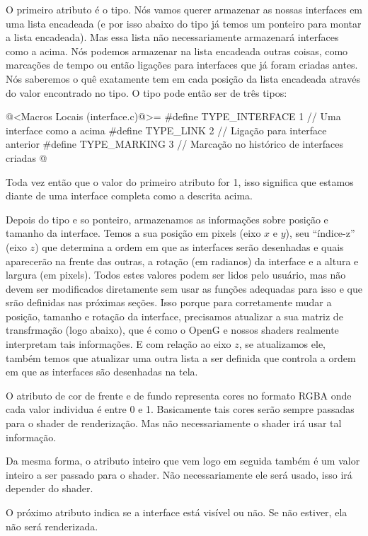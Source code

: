 O primeiro atributo é o tipo. Nós vamos querer armazenar as nossas
interfaces em uma lista encadeada (e por isso abaixo do tipo já temos
um ponteiro para montar a lista encadeada). Mas essa lista não
necessariamente armazenará interfaces como a acima. Nós podemos
armazenar na lista encadeada outras coisas, como marcações de tempo ou
então ligações para interfaces que já foram criadas antes. Nós
saberemos o quê exatamente tem em cada posição da lista encadeada
através do valor encontrado no tipo. O tipo pode então ser de três
tipos:

\iniciocodigo
@<Macros Locais (interface.c)@>=
#define TYPE_INTERFACE 1 // Uma interface como a acima
#define TYPE_LINK      2 // Ligação para interface anterior
#define TYPE_MARKING   3 // Marcação no histórico de interfaces criadas
@
\fimcodigo

Toda vez então que o valor do primeiro atributo for 1, isso significa
que estamos diante de uma interface completa como a descrita acima.

Depois do tipo e so ponteiro, armazenamos as informações sobre posição
e tamanho da interface. Temos a sua posição em pixels (eixo $x$ e
$y$), seu ``índice-z'' (eixo $z$) que determina a ordem em que as
interfaces serão desenhadas e quais aparecerão na frente das outras, a
rotação (em radianos) da interface e a altura e largura (em
pixels). Todos estes valores podem ser lidos pelo usuário, mas não
devem ser modificados diretamente sem usar as funções adequadas para
isso e que srão definidas nas próximas seções. Isso porque para
corretamente mudar a posição, tamanho e rotação da interface,
precisamos atualizar a sua matriz de transfrmação (logo abaixo), que é
como o OpenG e nossos shaders realmente interpretam tais
informações. E com relação ao eixo $z$, se atualizamos ele, também
temos que atualizar uma outra lista a ser definida que controla a
ordem em que as interfaces são desenhadas na tela.

O atributo de cor de frente e de fundo representa cores no formato
RGBA onde cada valor individua é entre 0 e 1. Basicamente tais cores
serão sempre passadas para o shader de renderização. Mas não
necessariamente o shader irá usar tal informação.

Da mesma forma, o atributo inteiro que vem logo em seguida também é um
valor inteiro a ser passado para o shader. Não necessariamente ele
será usado, isso irá depender do shader.

O próximo atributo indica se a interface está visível ou não. Se não
estiver, ela não será renderizada.

